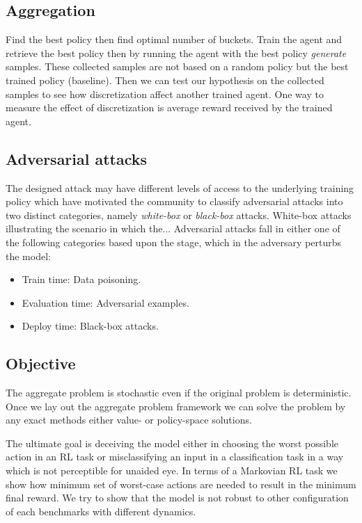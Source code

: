 \documentclass{article}
\begin{document}
    \subsection{Aggregation}
    Find the best policy then find optimal number of buckets.
    Train the agent and retrieve the best policy then by running the agent with the best policy \textit{generate}
    samples.
    These collected samples are not based on a random policy but the best trained policy (baseline).
    Then we can test our hypothesis on the collected samples to see how discretization affect another trained agent.
    One way to measure the effect of discretization is average reward received by the trained agent.


    \subsection{Adversarial attacks}
    The designed attack may have different levels of access to the underlying training policy which have motivated
    the community to classify adversarial attacks into two distinct categories, namely \textit{white-box} or
    \textit{black-box} attacks. White-box attacks illustrating the scenario in which the... Adversarial attacks fall
    in either one of the following categories based upon the stage, which in the adversary perturbs the model:
    \begin{itemize}
        \item Train time: Data poisoning.
        \item Evaluation time: Adversarial examples.
        \item Deploy time: Black-box attacks.
    \end{itemize}


    \subsection{Objective}
    The aggregate problem is stochastic even if the original problem is deterministic. Once we lay out the aggregate
    problem framework we can solve the problem by any exact methods either value- or policy-space solutions.


    The ultimate goal is deceiving the model either in choosing the worst possible action in an RL task or misclassifying an input in a classification task in a way which is not perceptible for unaided eye. In terms of a Markovian RL task we show how minimum set of worst-case actions are needed to result in the minimum final reward. We try to show that the model is not robust to other configuration of each benchmarks with different dynamics.
\end{document}
